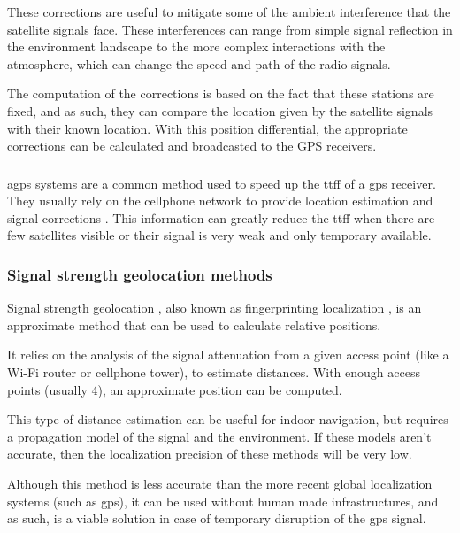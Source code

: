 These corrections are useful to mitigate some of the ambient interference that the satellite signals face. These interferences can range from simple signal reflection in the environment landscape to the more complex interactions with the atmosphere, which can change the speed and path of the radio signals.

The computation of the corrections \cite{Kim2007} is based on the fact that these stations are fixed, and as such, they can compare the location given by the satellite signals with their known location. With this position differential, the appropriate corrections can be calculated and broadcasted to the GPS receivers.


\subsubsection{}

\gls{agps} systems are a common method used to speed up the \gls{ttff} of a \gls{gps} receiver. They usually rely on the cellphone network to provide location estimation and signal corrections \cite{R.1948}. This information can greatly reduce the \gls{ttff} when there are few satellites visible or their signal is very weak and only temporary available.


\subsubsection{Signal strength geolocation methods}

Signal strength geolocation \cite{Kobayashi2002}, also known as fingerprinting localization \cite{Bshara2010}, is an approximate method that can be used to calculate relative positions.

It relies on the analysis of the signal attenuation from a given access point (like a Wi-Fi router or cellphone tower), to estimate distances. With enough access points (usually 4), an approximate position can be computed.

This type of distance estimation can be useful for indoor navigation, but requires a propagation model of the signal and the environment. If these models aren't accurate, then the localization precision of these methods will be very low.

Although this method is less accurate than the more recent global localization systems (such as \gls{gps}), it can be used without human made infrastructures, and as such, is a viable solution in case of temporary disruption of the \gls{gps} signal.


